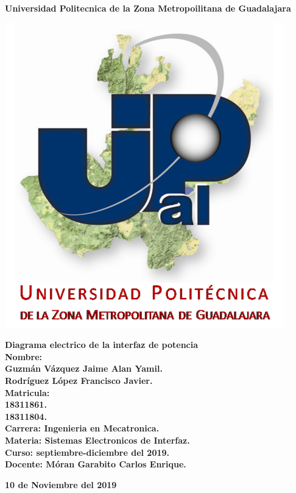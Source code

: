 \documentclass[12pt,a4paper]{article}
\author{Rodriguez Lopez Francisco Javier}
\begin{document}
\begin{center}
\LARGE \textbf{Universidad Politecnica de la Zona Metropoilitana de Guadalajara\\}


\includegraphics[scale=1]{Upzmg8.png}  

\large \textbf{Diagrama electrico de la interfaz de potencia}\\
\vspace{2cm}
\large \textbf{Nombre:\\
Guzmán Vázquez Jaime Alan Yamil.\\
Rodríguez López Francisco Javier.\\
\vspace{0.5cm} Matricula:\\
18311861.\\
18311804.\\
\vspace{0.5cm} Carrera: Ingenieria en Mecatronica.\\
\vspace{0.5cm} Materia: Sistemas Electronicos de Interfaz.\\
\vspace{0.5cm} Curso: septiembre-diciembre del 2019.\\
\vspace{0.5cm} Docente: Móran Garabito Carlos Enrique.}


\vspace{3cm}
\small \textbf{10 de Noviembre del 2019}
\end{center}
\end{document}
